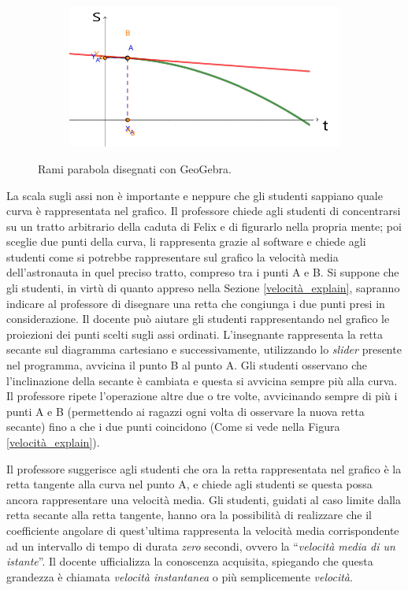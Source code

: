 \documentclass{report} \usepackage[T1]{fontenc} \usepackage[italian]{babel}
\begin{document}
\begin{figure}[H]
\begin{subfigure}[b]{0.49\textwidth}
  \end{subfigure}
  \begin{subfigure}[b]{0.49\textwidth}
  \includegraphics[width=\textwidth]{tg4}
  \end{subfigure}
  \caption{
           Rami parabola  disegnati con GeoGebra.
          }
  \label{fig:geogebra}
\end{figure}
La scala sugli assi non è importante e neppure che gli studenti sappiano quale
curva è rappresentata nel grafico.
Il professore chiede agli studenti di concentrarsi su un tratto arbitrario della
caduta di Felix e di figurarlo nella propria mente; poi sceglie due punti
della curva, li rappresenta grazie al software e chiede agli studenti
come si potrebbe rappresentare sul grafico la velocità media dell'astronauta
in quel preciso tratto, compreso tra i punti A e B.
Si suppone che gli studenti, in virtù di quanto appreso
nella Sezione \ref{velocità_explain}, sapranno indicare al professore di
disegnare una retta che congiunga i due punti presi in considerazione.
Il docente può aiutare gli studenti rappresentando nel grafico le proiezioni
dei punti scelti sugli assi ordinati.
L'insegnante rappresenta la retta secante sul diagramma cartesiano e
successivamente, utilizzando lo \emph{slider} presente nel programma,
avvicina il punto B al punto A. Gli studenti osservano che l'inclinazione
della secante è cambiata e questa si avvicina sempre più alla curva.
Il professore ripete l'operazione altre due o
tre volte, avvicinando sempre di più i punti A e B (permettendo ai ragazzi
ogni volta di osservare la nuova retta secante) fino a che i due punti
coincidono (Come si vede nella Figura \ref{velocità_explain}).

Il professore suggerisce agli studenti che ora la retta rappresentata nel grafico
è la retta tangente alla curva nel punto A, e chiede agli studenti se questa possa
ancora rappresentare una velocità media. Gli studenti, guidati al caso limite dalla retta
secante alla retta tangente, hanno ora la possibilità di realizzare che il coefficiente
angolare di quest'ultima rappresenta la velocità media corrispondente ad un intervallo
di tempo di durata \emph{zero} secondi, ovvero la ``\emph{velocità media di un istante}''.
Il docente ufficializza la conoscenza acquisita, spiegando che questa grandezza è
chiamata \emph{velocità instantanea} o più semplicemente \emph{velocità}.
\end{document}
